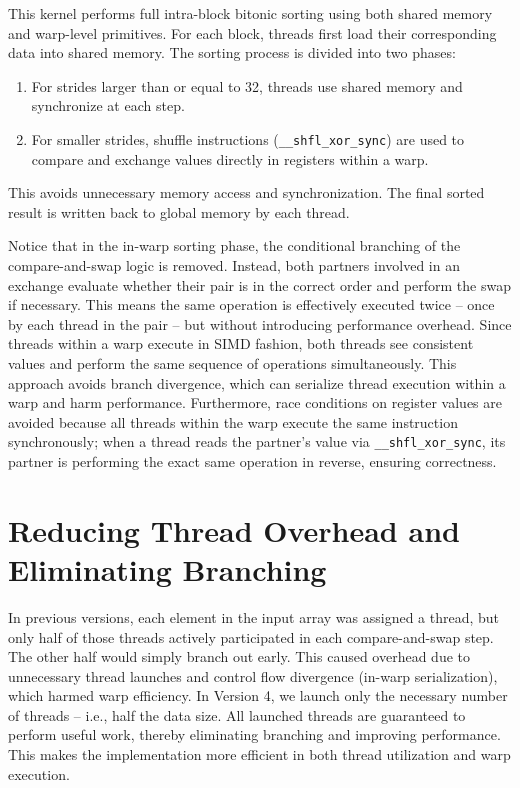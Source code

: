 \documentclass{article}
\begin{document}
This kernel performs full intra-block bitonic sorting using both shared memory and warp-level primitives.
For each block, threads first load their corresponding data into shared memory. The sorting process is divided 
into two phases:
\begin{enumerate}
    \item For strides larger than or equal to 32, threads use shared memory and synchronize at each step.
    \item For smaller strides, shuffle instructions (\texttt{\_\_shfl\_xor\_sync}) are used to compare and 
    exchange values directly in registers within a warp.
\end{enumerate}
This avoids unnecessary memory access and synchronization. The final sorted result is written back to global 
memory by each thread.

Notice that in the in-warp sorting phase, the conditional branching of the compare-and-swap logic is 
removed. Instead, both partners involved in an exchange evaluate whether their pair is in the correct 
order and perform the swap if necessary. This means the same operation is effectively executed twice -- once 
by each thread in the pair -- but without introducing performance overhead. Since threads within a warp execute 
in SIMD fashion, both threads see consistent values and perform the same sequence of operations simultaneously. 
This approach avoids branch divergence, which can serialize thread execution within a warp and harm performance.
Furthermore, race conditions on register values are avoided because all threads within the warp execute the same 
instruction synchronously; when a thread reads the partner’s value via \texttt{\_\_shfl\_xor\_sync}, its partner 
is performing the exact same operation in reverse, ensuring correctness.


\section{Reducing Thread Overhead and Eliminating Branching}

In previous versions, each element in the input array was assigned a thread, but only half of those threads
actively participated in each compare-and-swap step. The other half would simply branch out early. This caused
overhead due to unnecessary thread launches and control flow divergence (in-warp serialization), which harmed 
warp efficiency. In Version 4, we launch only the necessary number of threads -- i.e., half the data size. All 
launched threads are guaranteed to perform useful work, thereby eliminating branching and improving performance.
This makes the implementation more efficient in both thread utilization and warp execution.
\end{document}
